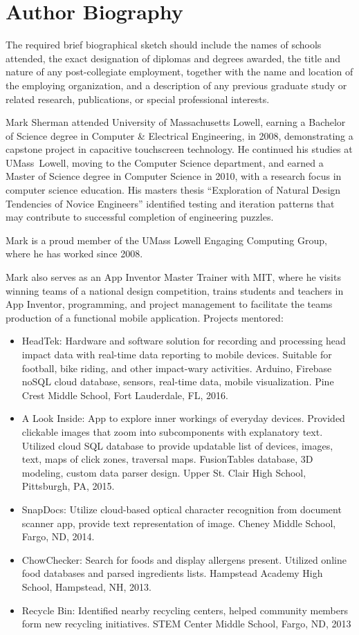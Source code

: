 \chapter{Author Biography}

The required brief biographical sketch should include the names of schools attended, the exact designation of diplomas and degrees awarded, the title and nature of any post-collegiate employment, together with the name and location of the employing organization, and a description of any previous graduate study or related research, publications, or special professional interests.

Mark Sherman attended University of Massachusetts Lowell, earning a  Bachelor of Science degree in Computer \& Electrical Engineering, in 2008, demonstrating a capstone project in capacitive touchscreen technology. He continued his studies at UMass~Lowell, moving to the Computer Science department, and earned a Master of Science degree in Computer Science in 2010, with a research focus in computer science education. His masters thesis ``Exploration of Natural Design Tendencies of Novice Engineers'' identified testing and iteration patterns that may contribute to successful completion of engineering puzzles.

Mark is a proud member of the UMass Lowell Engaging Computing Group, where he has worked since 2008.

Mark also serves as an App Inventor Master Trainer with MIT, where he visits winning teams of a national design competition, trains students and teachers in App Inventor, programming, and project management to facilitate the teams production of a functional mobile application.
Projects mentored:
\begin{itemize}
\item HeadTek: Hardware and software solution for recording and processing head impact data with real-time data
reporting to mobile devices. Suitable for football, bike riding, and other impact-wary activities. Arduino, Firebase noSQL cloud database, sensors, real-time data, mobile visualization. Pine Crest Middle School, Fort Lauderdale, FL, 2016.
\item A Look Inside: App to explore inner workings of everyday devices. Provided clickable images that zoom into subcomponents with explanatory text. Utilized cloud SQL database to provide updatable list of devices, images, text, maps of click zones, traversal maps. FusionTables database, 3D modeling, custom data parser design. Upper St. Clair High School, Pittsburgh, PA, 2015.
\item SnapDocs: Utilize cloud-based optical character recognition from document scanner app, provide text representation of image. Cheney Middle School, Fargo, ND, 2014.
\item ChowChecker: Search for foods and display allergens present. Utilized online food databases and parsed ingredients lists. Hampstead Academy High School, Hampstead, NH, 2013.
\item Recycle Bin: Identified nearby recycling centers, helped community members form new recycling initiatives. STEM Center Middle School, Fargo, ND, 2013
\end{itemize}

